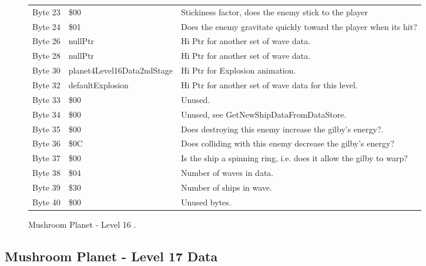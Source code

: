 \begin{figure}[H]
{\begin{adjustbox}{width=12cm}
\begin{tabular}{lll}
 Byte 23 & \$00                        & Stickiness factor, does the enemy stick to the player              \\
 Byte 24 & \$01                        & Does the enemy gravitate quickly toward the player when its hit?   \\
 Byte 26 & nullPtr                    & Hi Ptr for another set of wave data.                               \\
 Byte 28 & nullPtr                    & Hi Ptr for another set of wave data.                               \\
 Byte 30 & planet4Level16Data2ndStage & Hi Ptr for Explosion animation.                                    \\
 Byte 32 & defaultExplosion           & Hi Ptr for another set of wave data for this level.                \\
 Byte 33 & \$00                        & Unused.                                                            \\
 Byte 34 & \$00                        & Unused, see GetNewShipDataFromDataStore.                           \\
 Byte 35 & \$00                        & Does destroying this enemy increase the gilby's energy?.           \\
 Byte 36 & \$0C                        & Does colliding with this enemy decrease the gilby's energy?        \\
 Byte 37 & \$00                        & Is the ship a spinning ring, i.e. does it allow the gilby to warp? \\
 Byte 38 & \$04                        & Number of waves in data.                                           \\
 Byte 39 & \$30                        & Number of ships in wave.                                           \\
 Byte 40 & \$00                        & Unused bytes.                                                      \\
\bottomrule
\end{tabular}

  \end{adjustbox}

  }\caption*{Mushroom Planet - Level 16
.}
\end{figure}

\clearpage
\subsection{Mushroom Planet - Level 17 Data}

